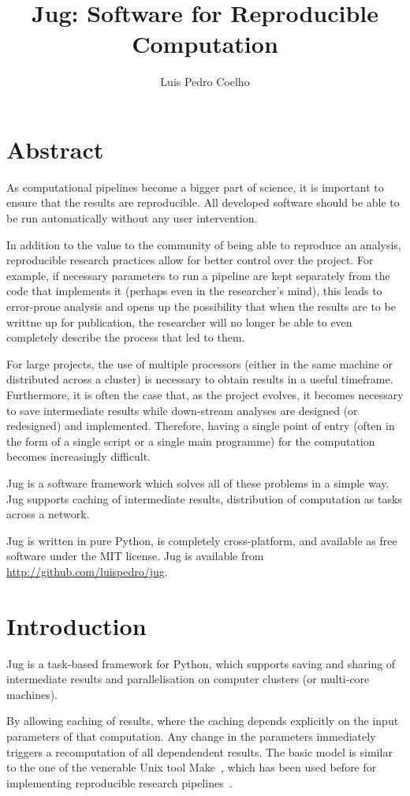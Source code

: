 \documentclass{article}
\title{Jug: Software for Reproducible Computation}
\author{Luis Pedro Coelho}
\begin{document}
\section*{Abstract}
As computational pipelines become a bigger part of science, it is important to
ensure that the results are reproducible. All developed software should be able
to be run automatically without any user intervention.

In addition to the value to the community of being able to reproduce an
analysis, reproducible research practices allow for better control over the
project. For example, if necessary parameters to run a pipeline are kept
separately from the code that implements it (perhaps even in the researcher's
mind), this leads to error-prone analysis and opens up the possibility that
when the results are to be writtne up for publication, the researcher will no
longer be able to even completely describe the process that led to them.

For large projects, the use of multiple processors (either in the same machine
or distributed across a cluster) is necessary to obtain results in a useful
timeframe. Furthermore, it is often the case that, as the project evolves, it
becomes necessary to save intermediate results while down-stream analyses are
designed (or redesigned) and implemented. Therefore, having a single point of
entry (often in the form of a single script or a single main programme) for the
computation becomes increasingly difficult.

Jug is a software framework which solves all of these problems in a
simple way. Jug supports caching of intermediate results, distribution of
computation as tasks across a network.

Jug is written in pure Python, is completely cross-platform, and available as
free software under the MIT license. Jug is available from
\url{http://github.com/luispedro/jug}.

\section{Introduction}
Jug is a task-based framework for Python, which supports saving and sharing of
intermediate results and parallelisation on computer clusters (or multi-core
machines).

By allowing caching of results, where the caching depends explicitly on the
input parameters of that computation. Any change in the parameters immediately
triggers a recomputation of all dependendent results. The basic model is
similar to the one of the venerable Unix tool Make~\citep{}, which has been
used before for implementing reproducible research pipelines~\citep{}.
\end{document}
